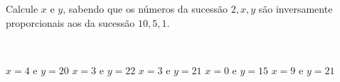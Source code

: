 \parbox{\linewidth}{

Calcule $x$ e $y$, sabendo que os números da sucessão $2, x, y$ são inversamente proporcionais aos da sucessão $10, 5, 1$.}\vspace{2mm}\\\parbox{\linewidth}{

$x=4$ e $y=20$
$x=3$ e $y=22$
$x=3$ e $y=21$
$x=0$ e $y=15$
$x=9$ e $y=21$

}

